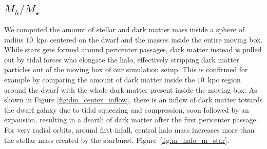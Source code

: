 



\subsection{$M_h/M_\star$}
We computed the amount of stellar and dark matter mass inside a sphere of radius $10$~kpc centered on the dwarf and the masses inside the entire moving box.
While stars gets formed around pericenter passages, dark matter instead is pulled out by tidal forces who elongate the halo, effectively stripping dark matter particles out of the moving box of our simulation setup.
This is confirmed for example by comparing the amount of dark matter inside the $10$~kpc region around the dwarf with the whole dark matter present inside the moving box.
As shown in Figure \ref{fig:dm_center_inflow}, there is an inflow of dark matter towards the dwarf galaxy due to tidal squeezing and compression, soon followed by an expansion, resulting in a dearth of dark matter after the first pericenter passage. %
For very radial orbits, around first infall, central halo mass increases more than the stellar mass created by the starburst, Figure~\ref{fig:m_halo_m_star}.

